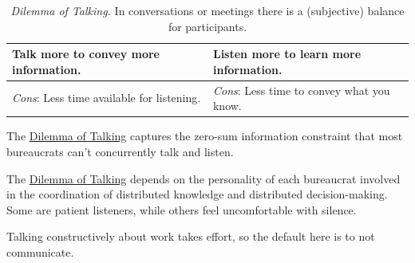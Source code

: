 \begin{center}
\begin{table}[H] %
\begin{tabular}{ | m{\dilemmatablewidth}| m{\dilemmatablewidth} | } 
  \hline
  \textbf{Talk more to convey more information.} & 
  \textbf{Listen more to learn more information.} \\ 
  \hline
  \textit{Cons}: Less time available for listening. & 
  \textit{Cons}: Less time to convey what you know. \\  
  \hline
\end{tabular}
\caption{
\textit{Dilemma of Talking.}
In conversations or meetings there is a (subjective) balance for participants.
}
\label{table:dilemma-personal-talk-or-listen}
\end{table}
\end{center}

The \hyperref[table:dilemma-personal-talk-or-listen]{Dilemma of Talking}%
captures the zero-sum information constraint that most bureaucrats can't concurrently talk and listen. 

The \hyperref[table:dilemma-personal-talk-or-listen]{Dilemma of Talking} depends on the personality of each bureaucrat involved in the coordination of distributed knowledge and distributed decision-making. Some are patient listeners, while others feel uncomfortable with silence.

Talking constructively about work takes effort, so the default here is to not communicate. 


